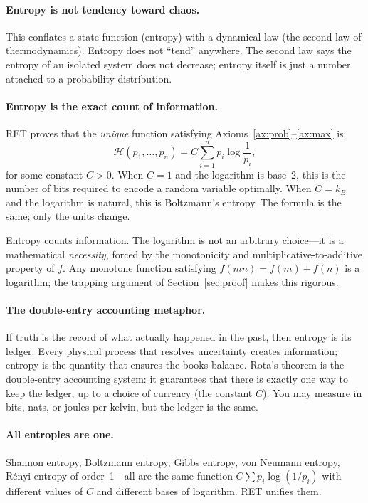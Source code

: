 \documentclass[12pt,a4paper]{article}
\theoremstyle{definition}
\newcommand{\Hfunc}{\mathcal{H}}
\begin{document}
\paragraph{Entropy is not tendency toward chaos.}
This conflates a state function (entropy) with a dynamical law (the
second law of thermodynamics).  Entropy does not ``tend'' anywhere.
The second law says the entropy of an isolated system does not decrease;
entropy itself is just a number attached to a probability distribution.

\paragraph{Entropy is the exact count of information.}
RET proves that the \emph{unique} function satisfying
Axioms~\ref{ax:prob}--\ref{ax:max} is:
\[
  \Hfunc(p_1, \dots, p_n) = C \sum_{i=1}^{n} p_i \log \frac{1}{p_i},
\]
for some constant $C > 0$.  When $C = 1$ and the logarithm is base~2,
this is the number of bits required to encode a random variable
optimally.  When $C = k_B$ and the logarithm is natural, this is
Boltzmann's entropy.  The formula is the same; only the units change.

Entropy counts information.  The logarithm is not an arbitrary
choice---it is a mathematical \emph{necessity}, forced by the
monotonicity and multiplicative-to-additive property of $f$.  Any
monotone function satisfying $f(mn) = f(m) + f(n)$ is a logarithm; the
trapping argument of Section~\ref{sec:proof} makes this rigorous.

\paragraph{The double-entry accounting metaphor.}
If truth is the record of what actually happened in the past, then
entropy is its ledger.  Every physical process that resolves uncertainty
creates information; entropy is the quantity that ensures the books
balance.  Rota's theorem is the double-entry accounting system: it
guarantees that there is exactly one way to keep the ledger, up to a
choice of currency (the constant $C$).  You may measure in bits, nats,
or joules per kelvin, but the ledger is the same.

\paragraph{All entropies are one.}
Shannon entropy, Boltzmann entropy, Gibbs entropy, von Neumann entropy,
R\'enyi entropy of order~1---all are the same function
$C \sum p_i \log(1/p_i)$ with different values of $C$ and different
bases of logarithm.  RET unifies them.
\end{document}
